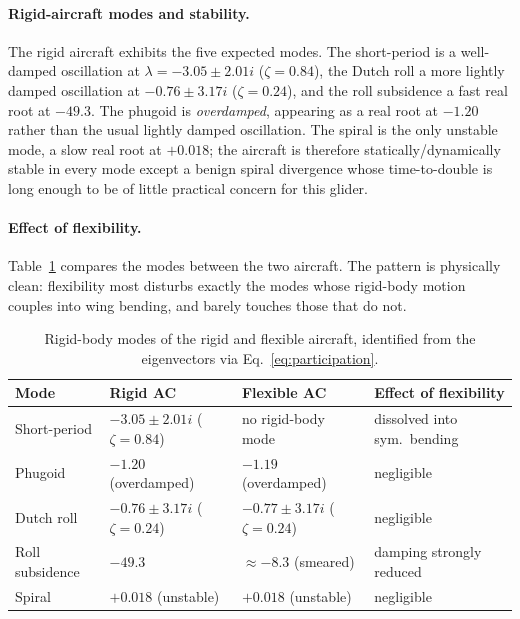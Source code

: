 \paragraph{Rigid-aircraft modes and stability.}
The rigid aircraft exhibits the five expected modes. The short-period is a well-damped oscillation at $\lambda=-3.05\pm2.01i$ ($\zeta=0.84$), the Dutch roll a more lightly damped oscillation at $-0.76\pm3.17i$ ($\zeta=0.24$), and the roll subsidence a fast real root at $-49.3$. The phugoid is \emph{overdamped}, appearing as a real root at $-1.20$ rather than the usual lightly damped oscillation. The spiral is the only unstable mode, a slow real root at $+0.018$; the aircraft is therefore statically/dynamically stable in every mode except a benign spiral divergence whose time-to-double is long enough to be of little practical concern for this glider.

\paragraph{Effect of flexibility.}
Table~\ref{tab:partB-modes} compares the modes between the two aircraft. The pattern is physically clean: flexibility most disturbs exactly the modes whose rigid-body motion couples into wing bending, and barely touches those that do not.
\begin{table}[htbp]
    \centering
    \caption{Rigid-body modes of the rigid and flexible aircraft, identified from the eigenvectors via Eq.~\eqref{eq:participation}.}
    \label{tab:partB-modes}
    \begin{tabular}{l l l l}
    \hline
    Mode & Rigid AC & Flexible AC & Effect of flexibility \\
    \hline
    Short-period    & $-3.05\pm2.01i$ ($\zeta{=}0.84$) & no rigid-body mode            & dissolved into sym.\ bending \\
    Phugoid         & $-1.20$ (overdamped)             & $-1.19$ (overdamped)          & negligible \\
    Dutch roll      & $-0.76\pm3.17i$ ($\zeta{=}0.24$) & $-0.77\pm3.17i$ ($\zeta{=}0.24$) & negligible \\
    Roll subsidence & $-49.3$                          & $\approx-8.3$ (smeared)       & damping strongly reduced \\
    Spiral          & $+0.018$ (unstable)              & $+0.018$ (unstable)           & negligible \\
    \hline
    \end{tabular}
\end{table}

